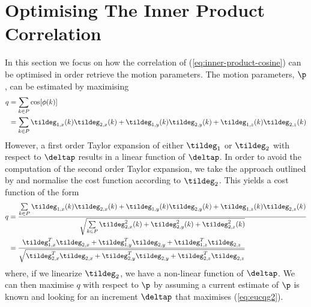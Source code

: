 \section{Optimising The Inner Product Correlation}\label{sec:inner-product}
In this section we focus on how the correlation of (\ref{eq:inner-product-cosine}) can be optimised in order retrieve the motion parameters. The motion parameters, $\p$, can be estimated by maximising
\begin{equation}
  \begin{aligned}\label{eq:eucq}
    q &= \sum \limits_{k \in P} \cos [\phi (k)] \\
      &= \sum \limits_{k \in P} \tildeg_{1,x}(k)\tildeg_{2,x}(k) + \tildeg_{1,y}(k)\tildeg_{2,y}(k) + \tildeg_{1,z}(k)\tildeg_{2,z}(k)
  \end{aligned}
\end{equation}
However, a first order Taylor expansion of either $\tildeg_1$ or $\tildeg_2$ with respect to $\deltap$ results in a linear function of $\deltap$. In order to avoid the computation of the second order Taylor expansion, we take the approach outlined by \cite{RefWorks:59} and normalise the cost function according to $\tildeg_2$. This yields a cost function of the form
\begin{equation}
  \begin{aligned}\label{eq:eucqg2}
    q &= \frac{\sum \limits_{k \in P} \tildeg_{1,x}(k)\tildeg_{2,x}(k) + \tildeg_{1,y}(k)\tildeg_{2,y}(k) + \tildeg_{1,z}(k)\tildeg_{2,z}(k)}{\sqrt{\sum \limits_{k \in P} \tildeg_{2,x}^2(k) + \tildeg_{2,y}^2(k) + \tildeg_{2,z}^2(k)}} \\
      &= \frac{\tildeg_{1,x}^T \tildeg_{2,x} + \tildeg_{1,y}^T \tildeg_{2,y} + \tildeg_{1,z}^T \tildeg_{2,z}}{\sqrt{\tildeg_{2,x}^T \tildeg_{2,x} + \tildeg_{2,y}^T \tildeg_{2,y} + \tildeg_{2,z}^T \tildeg_{2,z}}}
  \end{aligned}
\end{equation}
where, if we linearize $\tildeg_2$, we have a non-linear function of $\deltap$. We can then maximise $q$ with respect to $\p$ by assuming a current estimate of $\p$ is known and looking for an increment $\deltap$ that maximises (\ref{eq:eucqg2}).
